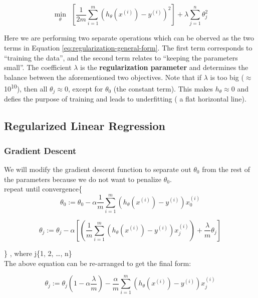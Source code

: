             \begin{equation}
                \min_\theta \:\:[ \frac{1}{2m} \sum_{i=1}^{m} ( h_\theta (x^{(i)}) - y^{(i)} )^2 ] + \lambda \sum_{j=1}^{n} \theta_j^2
                \label{eq:regularization-general-form}
            \end{equation}

            Here we are performing two separate operations which can be oberved as the two terms in Equation \ref{eq:regularization-general-form}. The first term corresponds to ``training the data'', and the second term relates to ``keeping the parameters small''. The coefficient $\lambda$ is the \textbf{regularization parameter} and determines the balance between the aforementioned two objectives. Note that if $\lambda$ is too big ($\approx$ 10\textsuperscript{10}), then all $\theta_j \approx 0$, except for $\theta_0$ (the constant term). This makes $h_\theta \approx 0$ and defies the purpose of training and leads to underfitting ( a flat horizontal line).




    \subsection{Regularized Linear Regression}
    \subsubsection{Gradient Descent} 
        We will modify the gradient descent function to separate out $\theta_0$ from the rest of the parameters because we do not want to penalize $\theta_0$.\\

        repeat until convergence\{  
            \[ \theta_0 := \theta_0 - \alpha \frac{1}{m} \sum_{i=1}^{m} ( h_\theta (x^{(i)}) - y^{(i)}) x_0^{(i)}\] 

            \[
                \theta_j := \theta_j - \alpha [ ( \frac{1}{m} \sum_{i=1}^{m} ( h_\theta (x^{(i)}) - y^{(i)}) x_j^{(i)} ) + \frac{\lambda}{m}\theta_j]
            \] 

        \} , where j\in \{1, 2, \ldots, n\} \\

        The above equation can be re-arranged to get the final form:

        \begin{equation}
            \boxed{
            \theta_j := \theta_j (1-\alpha \frac{\lambda}{m}) - \frac{\alpha}{m} \sum_{i=1}^{m} ( h_\theta (x^{(i)}) - y^{(i)}) x_j^{(i)}
        }
            \label{eq:regularized-gradient-descent}
        \end{equation}

